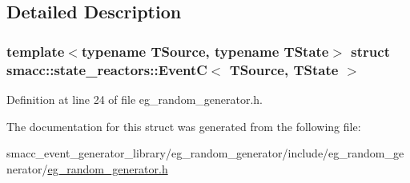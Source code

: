 \subsection{Detailed Description}
\subsubsection*{template$<$typename T\+Source, typename T\+State$>$\newline
struct smacc\+::state\+\_\+reactors\+::\+Event\+C$<$ T\+Source, T\+State $>$}



Definition at line 24 of file eg\+\_\+random\+\_\+generator.\+h.



The documentation for this struct was generated from the following file\+:\begin{DoxyCompactItemize}
\item 
smacc\+\_\+event\+\_\+generator\+\_\+library/eg\+\_\+random\+\_\+generator/include/eg\+\_\+random\+\_\+generator/\hyperlink{eg__random__generator_8h}{eg\+\_\+random\+\_\+generator.\+h}\end{DoxyCompactItemize}
